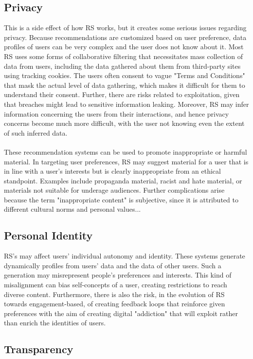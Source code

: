 \documentclass{article}
\begin{document}
\subsection{Privacy}  %
This is a side effect of how RS works, but it creates some serious issues regarding privacy. Because recommendations are customized based on user preference, data profiles of users can be very complex and the user does not know about it. Most RS uses some forms of collaborative filtering that necessitates mass collection of data from users, including the data gathered about them from third-party sites using tracking cookies. The users often consent to vague "Terms and Conditions" that mask the actual level of data gathering, which makes it difficult for them to understand their consent.\cite{IaAEC_in_RS} Further, there are risks related to exploitation, given that breaches might lead to sensitive information leaking. Moreover, RS may infer information concerning the users from their interactions, and hence privacy concerns become much more difficult, with the user not knowing even the extent of such inferred data.\\\\
These recommendation systems can be used to promote inappropriate or harmful material. In targeting user preferences, RS may suggest material for a user that is in line with a user's interests but is clearly inappropriate from an ethical standpoint. Examples include propaganda material, racist and hate material, or materials not suitable for underage audiences. Further complications arise because the term "inappropriate content" is subjective, since it is attributed to different cultural norms and personal values...
\subsection{Personal Identity} %
RS's may affect users' individual autonomy and identity. These systems generate dynamically profiles from users' data and the data of other users. Such a generation may misrepresent people's preferences and interests. This kind of misalignment can bias self-concepts of a user, creating restrictions to reach diverse content. Furthermore, there is also the risk, in the evolution of RS towards engagement-based, of creating feedback loops that reinforce given preferences with the aim of creating digital "addiction" that will exploit rather than enrich the identities of users.\cite{FB}
\subsection{Transparency}
\end{document}

